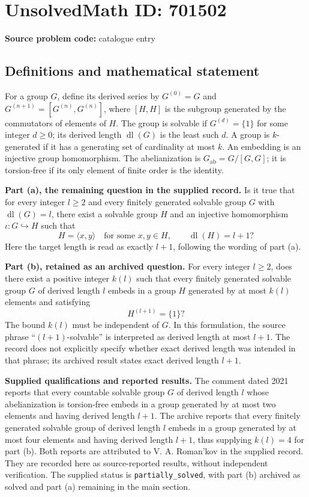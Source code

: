 \documentclass[11pt]{article}
\begin{document}
\section*{UnsolvedMath ID: 701502}
\textbf{Source problem code:} catalogue entry
\subsection{Definitions and mathematical statement}
For a group \(G\), define its derived series by \(G^{(0)}=G\) and \(G^{(n+1)}=[G^{(n)},G^{(n)}]\), where \([H,H]\) is the subgroup generated by the commutators of elements of \(H\). The group is solvable if \(G^{(d)}=\{1\}\) for some integer \(d\geq 0\); its derived length \(\operatorname{dl}(G)\) is the least such \(d\). A group is \(k\)-generated if it has a generating set of cardinality at most \(k\). An embedding is an injective group homomorphism. The abelianization is \(G_{\mathrm{ab}}=G/[G,G]\); it is torsion-free if its only element of finite order is the identity.

\textbf{Part (a), the remaining question in the supplied record.} Is it true that for every integer \(l\geq 2\) and every finitely generated solvable group \(G\) with \(\operatorname{dl}(G)=l\), there exist a solvable group \(H\) and an injective homomorphism \(\iota:G\hookrightarrow H\) such that
\[
H=\langle x,y\rangle\quad\text{for some }x,y\in H,
\qquad \operatorname{dl}(H)=l+1?
\]
Here the target length is read as exactly \(l+1\), following the wording of part (a).

\textbf{Part (b), retained as an archived question.} For every integer \(l\geq 2\), does there exist a positive integer \(k(l)\) such that every finitely generated solvable group \(G\) of derived length \(l\) embeds in a group \(H\) generated by at most \(k(l)\) elements and satisfying
\[
H^{(l+1)}=\{1\}?
\]
The bound \(k(l)\) must be independent of \(G\). In this formulation, the source phrase ``\((l+1)\)-solvable'' is interpreted as derived length at most \(l+1\). The record does not explicitly specify whether exact derived length was intended in that phrase; its archived result states exact derived length \(l+1\).

\textbf{Supplied qualifications and reported results.} The comment dated 2021 reports that every countable solvable group \(G\) of derived length \(l\) whose abelianization is torsion-free embeds in a group generated by at most two elements and having derived length \(l+1\). The archive reports that every finitely generated solvable group of derived length \(l\) embeds in a group generated by at most four elements and having derived length \(l+1\), thus supplying \(k(l)=4\) for part (b). Both reports are attributed to V. A. Roman'kov in the supplied record. They are recorded here as source-reported results, without independent verification. The supplied status is \texttt{partially\_solved}, with part (b) archived as solved and part (a) remaining in the main section.
\end{document}
